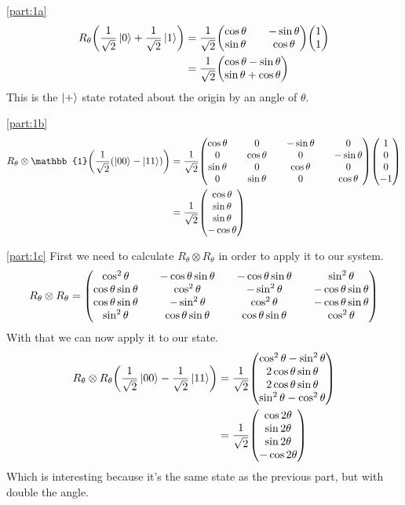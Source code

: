 \documentclass[boxes,pages]{homework}
\begin{document}
\begin{solution}
	\ref{part:1a}
	\begin{align*}
		R_\theta\qty(\frac{1}{\sqrt{2}}\ket{0} + \frac{1}{\sqrt{2}}\ket{1}) &= \frac{1}{\sqrt{2}}\mqty(\cos{\theta} && -\sin{\theta} \\ \sin{\theta} && \cos{\theta})\mqty(1 \\ 1) \\
		&= \frac{1}{\sqrt{2}}\mqty(\cos\theta - \sin\theta \\ \sin\theta + \cos\theta)
	\end{align*}
	This is the $\ket{+}$ state rotated about the origin by an angle of $\theta$.

	\ref{part:1b}
	\begin{align*}
		R_\theta\otimes\mathbb{1} \qty(\frac{1}{\sqrt{2}}\qty(\ket{00} - \ket{11})) & = \frac{1}{\sqrt{2}}\mqty(\cos\theta && 0 && -\sin\theta && 0 \\ 0 && \cos\theta && 0 && -\sin\theta \\ \sin\theta && 0 && \cos\theta && 0 \\ 0 &&\sin\theta &&  0 && \cos\theta)\mqty(1 \\ 0 \\ 0 \\ -1) \\
		&= \frac{1}{\sqrt{2}}\mqty(\cos\theta \\ \sin\theta \\ \sin\theta \\ -\cos\theta)
	\end{align*}

	\ref{part:1c}
	First we need to calculate $R_\theta\otimes R_\theta$ in order to apply it to our system.
	\begin{equation*}
		R_\theta\otimes R_\theta = \mqty(\cos^2\theta && -\cos\theta\sin\theta && -\cos\theta\sin\theta && \sin^2\theta \\ \cos\theta\sin\theta && \cos^2\theta && -\sin^2\theta && -\cos\theta\sin\theta \\ \cos\theta\sin\theta && -\sin^2\theta && \cos^2\theta && -\cos\theta\sin\theta \\ \sin^2\theta && \cos\theta\sin\theta && \cos\theta\sin\theta && \cos^2\theta)
	\end{equation*}
	With that we can now apply it to our state.
	\begin{align*}
		R_\theta\otimes R_\theta\qty(\frac{1}{\sqrt{2}}\ket{00} - \frac{1}{\sqrt{2}}\ket{11}) & = \frac{1}{\sqrt{2}}\mqty(\cos^2\theta - \sin^2\theta \\ 2\cos\theta\sin\theta \\ 2\cos\theta\sin\theta \\ \sin^2\theta - \cos^2\theta) \\
		                                                                                      & = \frac{1}{\sqrt{2}}\mqty(\cos 2\theta                \\ \sin 2\theta \\ \sin 2\theta \\ -\cos 2\theta)
	\end{align*}
	Which is interesting because it's the same state as the previous part, but with double the angle.


\end{solution}
\end{document}
